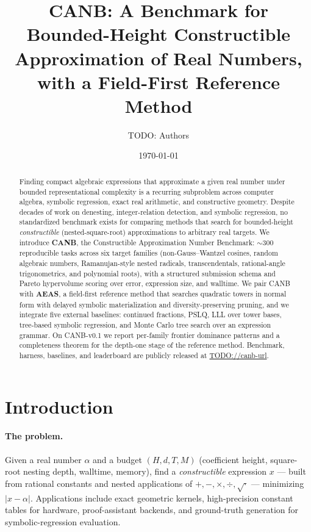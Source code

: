 \documentclass[11pt]{article}
\title{CANB: A Benchmark for Bounded-Height Constructible Approximation of Real Numbers, with a Field-First Reference Method}
\author{TODO: Authors}
\date{\today}
\begin{document}
\maketitle

\begin{abstract}
Finding compact algebraic expressions that approximate a given real number under bounded representational complexity is a recurring subproblem across computer algebra, symbolic regression, exact real arithmetic, and constructive geometry. Despite decades of work on denesting, integer-relation detection, and symbolic regression, no standardized benchmark exists for comparing methods that search for bounded-height \emph{constructible} (nested-square-root) approximations to arbitrary real targets.
We introduce \textbf{CANB}, the Constructible Approximation Number Benchmark: \(\sim 300\) reproducible tasks across six target families (non-Gauss--Wantzel cosines, random algebraic numbers, Ramanujan-style nested radicals, transcendentals, rational-angle trigonometrics, and polynomial roots), with a structured submission schema and Pareto hypervolume scoring over error, expression size, and walltime.
We pair CANB with \textbf{AEAS}, a field-first reference method that searches quadratic towers in normal form with delayed symbolic materialization and diversity-preserving pruning, and we integrate five external baselines: continued fractions, PSLQ, LLL over tower bases, tree-based symbolic regression, and Monte Carlo tree search over an expression grammar.
On CANB-v0.1 we report per-family frontier dominance patterns and a completeness theorem for the depth-one stage of the reference method. Benchmark, harness, baselines, and leaderboard are publicly released at \url{TODO://canb-url}.
\end{abstract}

\section{Introduction}

\paragraph{The problem.} Given a real number $\alpha$ and a budget $(H, d, T, M)$ (coefficient height, square-root nesting depth, walltime, memory), find a \emph{constructible} expression $x$ — built from rational constants and nested applications of $+, -, \times, \div, \sqrt{\cdot}$ — minimizing $|x - \alpha|$. Applications include exact geometric kernels, high-precision constant tables for hardware, proof-assistant backends, and ground-truth generation for symbolic-regression evaluation.
\end{document}

